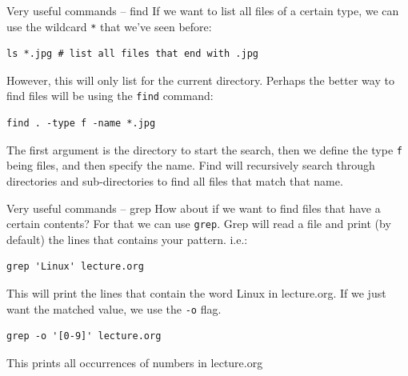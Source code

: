 \documentclass[10pt]{beamer}
\begin{document}
\begin{frame}[label={sec:org6986597},fragile]{Very useful commands -- find}
 If we want to list all files of a certain type, we can use the wildcard \texttt{*} that
we've seen before:

\begin{verbatim}
ls *.jpg # list all files that end with .jpg
\end{verbatim}

However, this will only list for the current directory. Perhaps the better way
to find files will be using the \texttt{find} command:

\begin{verbatim}
find . -type f -name *.jpg
\end{verbatim}

The first argument is the directory to start the search, then we define the type
\texttt{f} being files, and then specify the name. Find will recursively search through
directories and sub-directories to find all files that match that name.
\end{frame}

\begin{frame}[label={sec:orgeead848},fragile]{Very useful commands -- grep}
 How about if we want to find files that have a certain contents? For that we can
use \texttt{grep}. Grep will read a file and print (by default) the lines that contains
your pattern. i.e.:

\begin{verbatim}
grep 'Linux' lecture.org
\end{verbatim}

This will print the lines that contain the word Linux in lecture.org. If we just
want the matched value, we use the \texttt{-o} flag.

\begin{verbatim}
grep -o '[0-9]' lecture.org
\end{verbatim}

This prints all occurrences of numbers in lecture.org
\end{frame}
\end{document}
